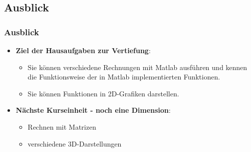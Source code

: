       \subsection{Ausblick}
      \begin{frame}
        \frametitle{Ausblick}
        \begin{itemize}
            \item \textbf{Ziel der Hausaufgaben zur Vertiefung}:
            \begin{itemize}
                \item Sie können verschiedene Rechnungen mit Matlab ausführen und kennen die Funktionsweise der in Matlab implementierten Funktionen.
                \item Sie können Funktionen in 2D-Grafiken darstellen.
            \end{itemize}
            \item \textbf{Nächste Kurseinheit - noch eine Dimension}:
            \begin{itemize}
                \item Rechnen mit Matrizen
                \item verschiedene 3D-Darstellungen
            \end{itemize}
        \end{itemize}
      \end{frame}


